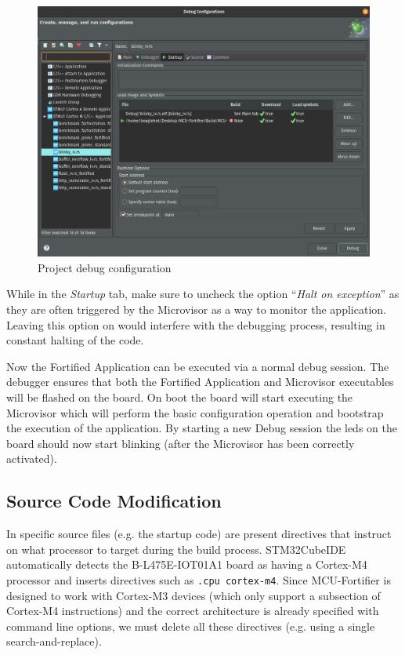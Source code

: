 \documentclass{article}
\begin{document}
\begin{figure}
\centering
\includegraphics[scale=.32]{images/startup.png}
\caption{Project debug configuration}
\label{fig:startup}
\end{figure}

While in the \textit{Startup} tab, make sure to uncheck the option ``\textit{Halt on exception}'' as they are often triggered by the Microvisor as a way to monitor the application. Leaving this option on would interfere with the debugging process, resulting in constant halting of the code.

Now the Fortified Application can be executed via a normal debug session. The debugger ensures that both the Fortified Application and Microvisor executables will be flashed on the board. On boot the board will start executing the Microvisor which will perform the basic configuration operation and bootstrap the execution of the application.
By starting a new Debug session the leds on the board should now start blinking (after the Microvisor has been correctly activated).

\subsection{Source Code Modification}
In specific source files (e.g. the startup code) are present directives that instruct on what processor to target during the build process. STM32CubeIDE automatically detects the B-L475E-IOT01A1 board as having a Cortex-M4 processor and inserts directives such as \verb|.cpu cortex-m4|. Since MCU-Fortifier is designed to work with Cortex-M3 devices (which only support a subsection of Cortex-M4 instructions) and the correct architecture is already specified with command line options, we must delete all these directives (e.g. using a single search-and-replace).
\end{document}
